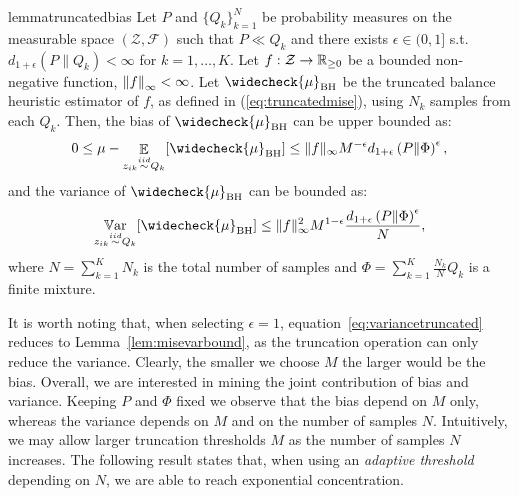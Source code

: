 \documentclass{article}
\begin{document}
\begin{restatable}{lemma}{truncatedbias}\label{lem:truncatedbias}
	Let $P$ and $\{ Q_k \}_{k=1}^N$ be probability measures on the measurable space $(\mathcal{Z},\mathcal{F})$ such that $P\ll Q_k$ and there exists $\epsilon \in (0,1]$ s.t. $d_{1+\epsilon}(P\|Q_k)<\infty$ for $k=1,\dots,K$. Let $f:\mathcal{Z}\to\Reals_{\ge 0}$ be a bounded non-negative function, \ie $\norm[\infty]{f}<\infty$. Let $\widecheck{\mu}_{\text{BH}}$ be the truncated balance heuristic estimator of $f$, as defined in (\ref{eq:truncatedmise}), using $N_k$ \iid samples from each $Q_k$. Then, the bias of $\widecheck{\mu}_{\text{BH}}$ can be upper bounded as:
	 \begin{equation}
	 \label{eq:biastruncated}
         0 \le \mu - \Exp_{z_{ik} \simiid Q_k} [\widecheck{\mu}_{\text{BH}}] \le  \|f\|_{\infty} M^{-\epsilon} d_{1+\epsilon}\left( P \| \Phi \right)^{\epsilon},
    \end{equation}
    and the variance of $\widecheck{\mu}_{\text{BH}}$ can be bounded as:
    \begin{equation}
    \label{eq:variancetruncated}
         \Var_{z_{ik} \simiid Q_k} [\widecheck{\mu}_{\text{BH}}] \le  \|f\|_{\infty}^2 M^{1-\epsilon} \frac{d_{1+\epsilon}\left( P \| \Phi \right)^{\epsilon}}{N},
    \end{equation}
	where ${N=\sum_{k=1}^{K}N_k}$ is the total number of samples and ${\Phi=\sum_{k=1}^K\frac{N_k}{N}Q_k}$ is a finite mixture.
\end{restatable}
%
It is worth noting that, when selecting $\epsilon=1$, equation~\eqref{eq:variancetruncated} reduces to Lemma~\ref{lem:misevarbound}, as the truncation operation can only reduce the variance. Clearly, the smaller we choose $M$ the larger would be the bias. Overall, we are interested in mining the joint contribution of bias and variance. Keeping $P$ and $\Phi$ fixed we observe that the bias depend on $M$ only, whereas the variance depends on $M$ and on the number of samples $N$. Intuitively, we may allow larger truncation thresholds $M$ as the number of samples $N$ increases. The following result states that, when using an \emph{adaptive threshold} depending on $N$, we are able to reach exponential concentration.
\end{document}
